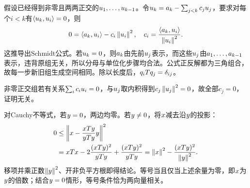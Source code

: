 \label{der:3-4}
假设已经得到非零且两两正交的$u_1,\ldots,u_{k-1}$。令$u_k=a_k-\sum_{j<k}c_ju_j$，要求对每个$i<k$有$\langle u_k,u_i\rangle=0$，则
\[0=\langle a_k,u_i\rangle-c_i\left\lVert u_i\right\rVert^2,
\quad c_i=\dfrac{\langle a_k,u_i\rangle}{\left\lVert u_i\right\rVert^2}.\]
这推导出Schmidt公式。若$u_k=0$，则$a_k$由先前$u_j$表示，而这些$u_j$由$a_1,\ldots,a_{k-1}$表示，违背原组无关，所以分母与单位化步骤均合法。公式正反解都为三角组合，故每一步新旧组生成空间相同。除以长度后，$q_iTq_j=\delta_{ij}$。

非零正交组若有关系$\sum_i c_iu_i=0$，与$u_j$取内积得到$c_j\left\lVert u_j\right\rVert^2=0$，故全部$c_j=0$，证明无关。

对Cauchy不等式，若$y=0$，两边均零。若$y\ne0$，将$x$减去沿$y$的投影：
\[\begin{aligned}
0&\le\left\|x-\dfrac{xTy}{yTy}y\right\|^2\\
&=xTx-2\dfrac{(xTy)^2}{yTy}+\dfrac{(xTy)^2}{yTy}
=\left\lVert x\right\rVert^2-\dfrac{(xTy)^2}{\left\lVert y\right\rVert^2}.
\end{aligned}\]
移项并乘正数$\left\lVert y\right\rVert^2$、开非负平方根即得结论。等号当且仅当上述余量为零，即$x$为$y$的倍数；结合$y=0$情形，等号条件恰为两向量相关。
